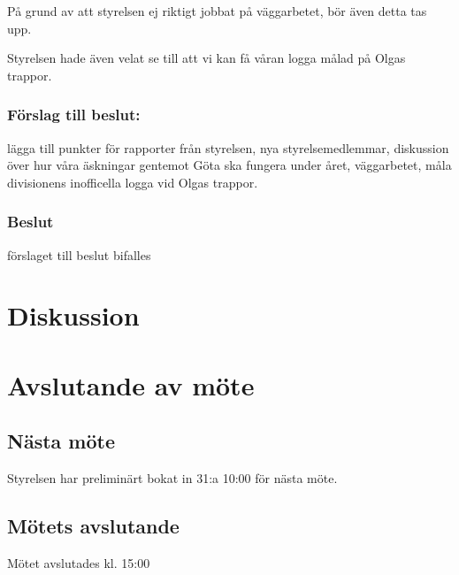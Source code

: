 \documentclass[protokoll]{dvd}
\begin{document}
På grund av att styrelsen ej riktigt jobbat på väggarbetet, bör även detta tas upp.

Styrelsen hade även velat se till att vi kan få våran logga målad på Olgas trappor.

\subsubsection*{Förslag till beslut:}
\begin{attsatser}
    \item lägga till punkter för rapporter från styrelsen, nya styrelsemedlemmar,
          diskussion över hur våra äskningar gentemot Göta ska fungera under året,
          väggarbetet, måla divisionens inofficella logga vid Olgas trappor.
\end{attsatser}

\subsubsection*{Beslut}
\begin{attsatser}
    \item förslaget till beslut bifalles
\end{attsatser}


\section{Diskussion}

\newpage
\section{Avslutande av möte}

\subsection{Nästa möte}
Styrelsen har preliminärt bokat in 31:a 10:00 för nästa möte.

\subsection{Mötets avslutande}
Mötet avslutades kl. 15:00

\styrelsesignaturer
\end{document}
